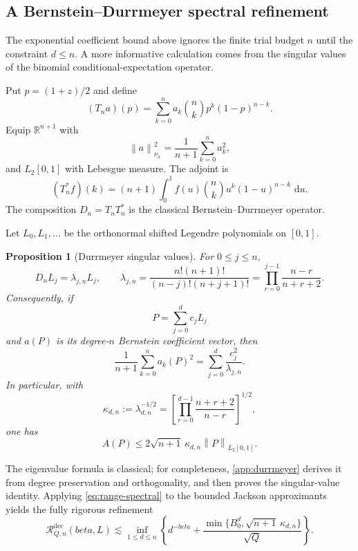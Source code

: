 \documentclass[11pt]{article}
\def\beta{beta}%
\newtheorem{proposition}[theorem]{Proposition}
\newcommand{\R}{\mathbb R}
\newcommand{\calR}{\mathcal R}
\newcommand{\norm}[1]{\left\lVert#1\right\rVert}
\newcommand{\dd}{\,\mathrm d}
\begin{document}
\subsection{A Bernstein--Durrmeyer spectral refinement}
\label{sec:durrmeyer}

The exponential coefficient bound above ignores the finite trial budget $n$ until the constraint $d\le n$.  A more informative calculation comes from the singular values of the binomial conditional-expectation operator.

Put $p=(1+z)/2$ and define
\[
(T_na)(p)
=
\sum_{k=0}^n a_k\binom nkp^k(1-p)^{n-k}.
\]
Equip $\R^{n+1}$ with
\[
\norm{a}_{\nu_n}^2
=
\frac1{n+1}\sum_{k=0}^n a_k^2,
\]
and $L_2[0,1]$ with Lebesgue measure.  The adjoint is
\[
(T_n^*f)(k)
=
(n+1)\int_0^1f(u)\binom nk u^k(1-u)^{n-k}\,\dd u.
\]
The composition $D_n=T_nT_n^*$ is the classical Bernstein--Durrmeyer operator.

Let $L_0,L_1,\dots$ be the orthonormal shifted Legendre polynomials on $[0,1]$.

\begin{proposition}[Durrmeyer singular values]
\label{prop:durrmeyer}
For $0\le j\le n$,
\begin{equation}
\label{eq:durrmeyer-eigen}
D_nL_j=\lambda_{j,n}L_j,
\qquad
\lambda_{j,n}
=
\frac{n!(n+1)!}{(n-j)!(n+j+1)!}
=
\prod_{r=0}^{j-1}\frac{n-r}{n+r+2}.
\end{equation}
Consequently, if
\[
P=\sum_{j=0}^d c_jL_j
\]
and $a(P)$ is its degree-$n$ Bernstein coefficient vector, then
\begin{equation}
\label{eq:coefficient-spectral}
\frac1{n+1}\sum_{k=0}^n a_k(P)^2
=
\sum_{j=0}^d\frac{c_j^2}{\lambda_{j,n}}.
\end{equation}
In particular, with
\begin{equation}
\label{eq:kappa}
\kappa_{d,n}
:=
\lambda_{d,n}^{-1/2}
=
\left[
\prod_{r=0}^{d-1}\frac{n+r+2}{n-r}
\right]^{1/2},
\end{equation}
one has
\begin{equation}
\label{eq:range-spectral}
A(P)
\le
2\sqrt{n+1}\,\kappa_{d,n}\norm{P}_{L_2[0,1]}.
\end{equation}
\end{proposition}

The eigenvalue formula is classical; for completeness, \cref{app:durrmeyer} derives it from degree preservation and orthogonality, and then proves the singular-value identity.  Applying \eqref{eq:range-spectral} to the bounded Jackson approximants yields the fully rigorous refinement
\begin{equation}
\label{eq:spectral-upper}
\calR^{\mathrm{dec}}_{Q,n}(\beta,L)
\lesssim
\inf_{1\le d\le n}
\left\{
 d^{-\beta}
+
\frac{\min\{B_0^d,\sqrt{n+1}\,\kappa_{d,n}\}}{\sqrt Q}
\right\}.
\end{equation}
\end{document}
